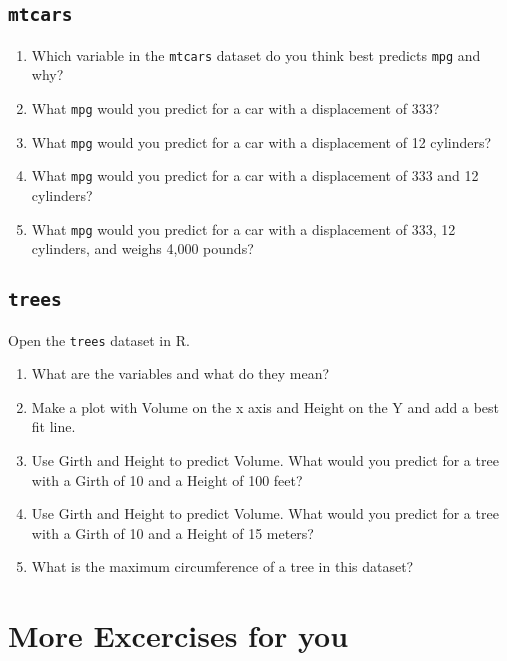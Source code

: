 \documentclass[
]{book}
\providecommand{\tightlist}{%
  \setlength{\itemsep}{0pt}\setlength{\parskip}{0pt}}
\begin{document}
\hypertarget{mtcars}{%
\subsection{\texorpdfstring{\texttt{mtcars}}{mtcars}}\label{mtcars}}

\begin{enumerate}
\def\labelenumi{\arabic{enumi}.}
\tightlist
\item
  Which variable in the \texttt{mtcars} dataset do you think best predicts \texttt{mpg} and why?
\item
  What \texttt{mpg} would you predict for a car with a displacement of 333?
\item
  What \texttt{mpg} would you predict for a car with a displacement of 12 cylinders?
\item
  What \texttt{mpg} would you predict for a car with a displacement of 333 and 12 cylinders?
\item
  What \texttt{mpg} would you predict for a car with a displacement of 333, 12 cylinders, and weighs 4,000 pounds?
\end{enumerate}

\hypertarget{trees}{%
\subsection{\texorpdfstring{\texttt{trees}}{trees}}\label{trees}}

Open the \texttt{trees} dataset in R.

\begin{enumerate}
\def\labelenumi{\arabic{enumi}.}
\tightlist
\item
  What are the variables and what do they mean?
\item
  Make a plot with Volume on the x axis and Height on the Y and add a best fit line.
\item
  Use Girth and Height to predict Volume. What would you predict for a tree with a Girth of 10 and a Height of 100 feet?
\item
  Use Girth and Height to predict Volume. What would you predict for a tree with a Girth of 10 and a Height of 15 meters?
\item
  What is the maximum circumference of a tree in this dataset?
\end{enumerate}

\hypertarget{more-excercises-for-you}{%
\section{\texorpdfstring{More Excercises for \textbf{you}}{More Excercises for you}}\label{more-excercises-for-you}}
\end{document}
